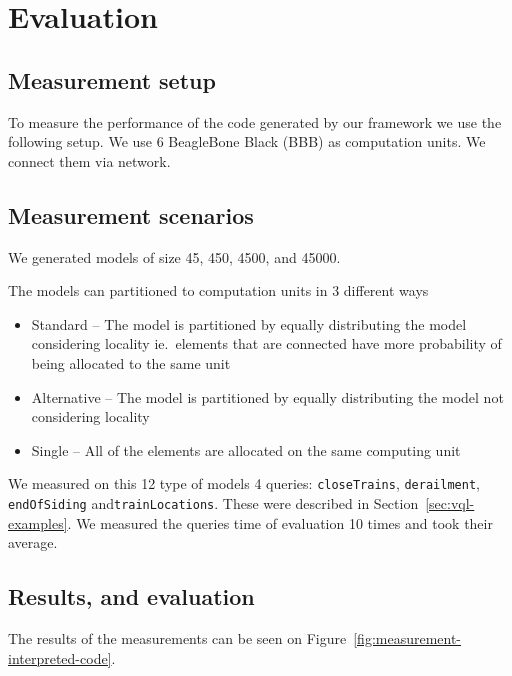 
\chapter{Evaluation}


\section{Measurement setup}

To measure the performance of the code generated by our framework we use the following setup. We use 6 BeagleBone Black (BBB) \cite{BBB} as computation units. We connect them via network. 


\section{Measurement scenarios}

We generated models of size 45, 450, 4500, and 45000.

The models can partitioned to computation units in 3 different ways 
\begin{itemize}
	\item Standard -- The model is partitioned by equally distributing the model considering locality ie.\ elements that are connected have more probability of being allocated to the same unit
	\item Alternative -- The model is partitioned by equally distributing the model not considering locality
	\item Single -- All of the elements are allocated on the same computing unit
\end{itemize}

We measured on this 12 type of models 4 queries: \texttt{closeTrains}, \texttt{derailment}, \texttt{endOfSiding} and\texttt{trainLocations}. 
These were described in Section~\ref{sec:vql-examples}.
We measured the queries time of evaluation 10 times and took their average.

\pagebreak

\section{Results, and evaluation}

The results of the measurements can be seen on Figure~\ref{fig:measurement-interpreted-code}.

